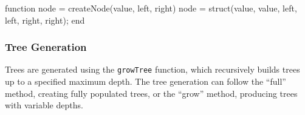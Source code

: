 \documentclass[
  letterpaper,
  DIV=11,
  numbers=noendperiod]{scrartcl}
\newenvironment{Shaded}{\begin{snugshade}}{\end{snugshade}}
\newcommand{\KeywordTok}[1]{\textcolor[rgb]{0.00,0.23,0.31}{#1}}
\newcommand{\NormalTok}[1]{\textcolor[rgb]{0.00,0.23,0.31}{#1}}
\newcommand{\OperatorTok}[1]{\textcolor[rgb]{0.37,0.37,0.37}{#1}}
\newcommand{\SpecialStringTok}[1]{\textcolor[rgb]{0.13,0.47,0.30}{#1}}
\newcommand{\VariableTok}[1]{\textcolor[rgb]{0.07,0.07,0.07}{#1}}
\begin{document}
\begin{Shaded}
\begin{Highlighting}[]
\KeywordTok{function} \VariableTok{node} \OperatorTok{=} \VariableTok{createNode}\NormalTok{(}\VariableTok{value}\OperatorTok{,} \VariableTok{left}\OperatorTok{,} \VariableTok{right}\NormalTok{)}
    \VariableTok{node} \OperatorTok{=} \VariableTok{struct}\NormalTok{(}\SpecialStringTok{\textquotesingle{}value\textquotesingle{}}\OperatorTok{,} \VariableTok{value}\OperatorTok{,} \SpecialStringTok{\textquotesingle{}left\textquotesingle{}}\OperatorTok{,} \VariableTok{left}\OperatorTok{,} \SpecialStringTok{\textquotesingle{}right\textquotesingle{}}\OperatorTok{,} \VariableTok{right}\NormalTok{)}\OperatorTok{;}
\KeywordTok{end}
\end{Highlighting}
\end{Shaded}

\subsubsection{Tree Generation}\label{tree-generation}

Trees are generated using the \texttt{growTree} function, which
recursively builds trees up to a specified maximum depth. The tree
generation can follow the ``full'' method, creating fully populated
trees, or the ``grow'' method, producing trees with variable depths.
\end{document}
